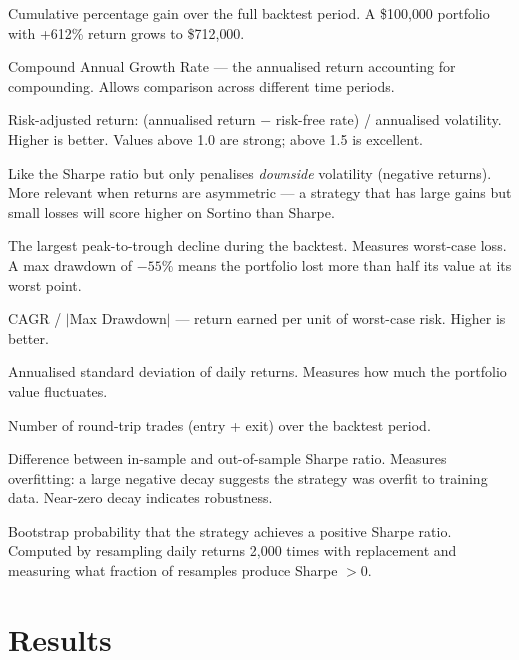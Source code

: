 \documentclass[11pt]{article}
\begin{document}
\begin{description}[style=nextline, leftmargin=4cm, font=\bfseries]
    \item[Total Return] Cumulative percentage gain over the full backtest period. A \$100{,}000 portfolio with +612\% return grows to \$712{,}000.
    \item[CAGR] Compound Annual Growth Rate --- the annualised return accounting for compounding. Allows comparison across different time periods.
    \item[Sharpe Ratio] Risk-adjusted return: (annualised return $-$ risk-free rate) / annualised volatility. Higher is better. Values above 1.0 are strong; above 1.5 is excellent.
    \item[Sortino Ratio] Like the Sharpe ratio but only penalises \emph{downside} volatility (negative returns). More relevant when returns are asymmetric --- a strategy that has large gains but small losses will score higher on Sortino than Sharpe.
    \item[Max Drawdown] The largest peak-to-trough decline during the backtest. Measures worst-case loss. A max drawdown of $-55\%$ means the portfolio lost more than half its value at its worst point.
    \item[Calmar Ratio] CAGR / $|$Max Drawdown$|$ --- return earned per unit of worst-case risk. Higher is better.
    \item[Volatility] Annualised standard deviation of daily returns. Measures how much the portfolio value fluctuates.
    \item[Trades] Number of round-trip trades (entry + exit) over the backtest period.
    \item[Sharpe Decay] Difference between in-sample and out-of-sample Sharpe ratio. Measures overfitting: a large negative decay suggests the strategy was overfit to training data. Near-zero decay indicates robustness.
    \item[P(Sharpe $> 0$)] Bootstrap probability that the strategy achieves a positive Sharpe ratio. Computed by resampling daily returns 2{,}000 times with replacement and measuring what fraction of resamples produce Sharpe $> 0$.
\end{description}

\section*{Results}
\end{document}
